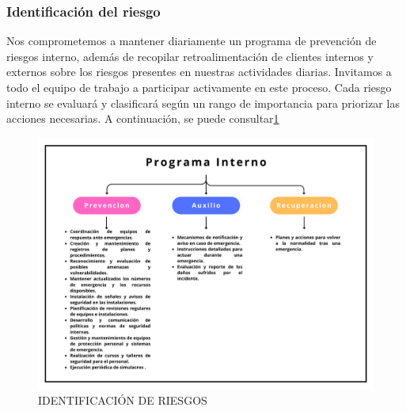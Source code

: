     \subsubsection{Identificación del riesgo}
    Nos comprometemos a mantener diariamente un programa de prevención de riesgos interno, además de recopilar retroalimentación de clientes internos y externos sobre los riesgos presentes en nuestras actividades diarias. Invitamos a todo el equipo de trabajo a participar activamente en este proceso. Cada riesgo interno se evaluará y clasificará según un rango de importancia para priorizar las acciones necesarias. A continuación, se puede consultar\ref{fig:RIESGOS} 
    \begin{figure}
        \centering
        \includegraphics[trim = {0mm 0mm 0mm 0mm},clip,scale=0.3]{24/Img/programaInterno.pdf}
        \caption{IDENTIFICACIÓN DE RIESGOS}
        \label{fig:RIESGOS}
    \end{figure}
